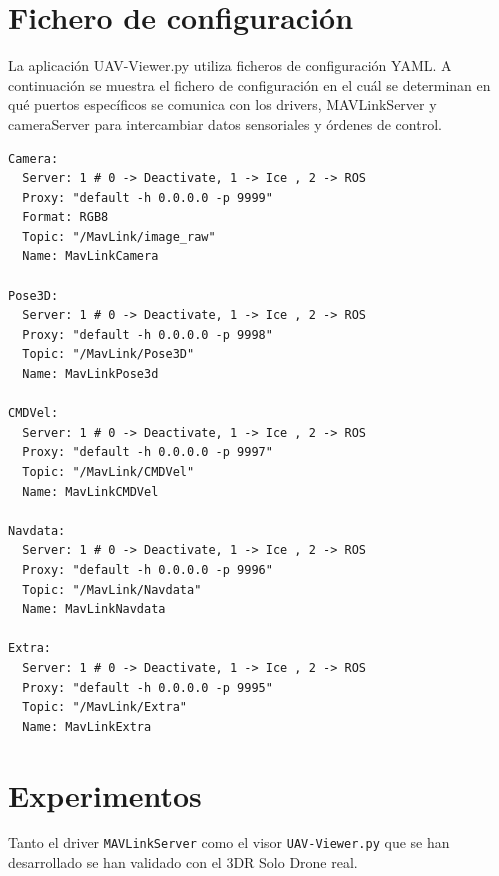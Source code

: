 \section{Fichero de configuración}

La aplicación UAV-Viewer.py utiliza ficheros de configuración YAML. A continuación se muestra el fichero de configuración en el cuál se determinan en qué puertos específicos se comunica con los drivers, MAVLinkServer y cameraServer para intercambiar datos sensoriales y órdenes de control.

\begin{lstlisting}[frame=single]
Camera:
  Server: 1 # 0 -> Deactivate, 1 -> Ice , 2 -> ROS
  Proxy: "default -h 0.0.0.0 -p 9999"
  Format: RGB8
  Topic: "/MavLink/image_raw"
  Name: MavLinkCamera

Pose3D:
  Server: 1 # 0 -> Deactivate, 1 -> Ice , 2 -> ROS
  Proxy: "default -h 0.0.0.0 -p 9998"
  Topic: "/MavLink/Pose3D"
  Name: MavLinkPose3d

CMDVel:
  Server: 1 # 0 -> Deactivate, 1 -> Ice , 2 -> ROS
  Proxy: "default -h 0.0.0.0 -p 9997"
  Topic: "/MavLink/CMDVel"
  Name: MavLinkCMDVel

Navdata:
  Server: 1 # 0 -> Deactivate, 1 -> Ice , 2 -> ROS
  Proxy: "default -h 0.0.0.0 -p 9996"
  Topic: "/MavLink/Navdata"
  Name: MavLinkNavdata

Extra:
  Server: 1 # 0 -> Deactivate, 1 -> Ice , 2 -> ROS
  Proxy: "default -h 0.0.0.0 -p 9995"
  Topic: "/MavLink/Extra"
  Name: MavLinkExtra
\end{lstlisting}

\section{Experimentos}

Tanto el driver \texttt{MAVLinkServer} como el visor \texttt{UAV-Viewer.py} que se han desarrollado se han validado con el 3DR Solo Drone real.

